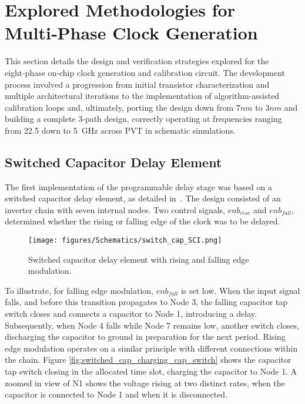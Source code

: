 \section{Explored Methodologies for Multi‑Phase Clock Generation}\label{sec:methodology}

This section details the design and verification strategies explored for the eight‑phase on‑chip clock generation and calibration circuit. The development process involved a progression from initial transistor characterization and multiple architectural iterations to the implementation of algorithm-assisted calibration loops and, ultimately, porting the design down from $7nm$ to $3 nm$ and building a complete 3-path design, correctly operating at frequencies ranging from 22.5 down to 5~GHz across PVT in schematic simulations.

\subsection{Switched Capacitor Delay Element}\label{sec:switched_cap}

The first implementation of the programmable delay stage was based on a switched capacitor delay element, as detailed in~\cite{Ramazanoglu2018switched}. The design consisted of an inverter chain with seven internal nodes. Two control signals, $enb_{rise}$ and $enb_{fall}$, determined whether the rising or falling edge of the clock was to be delayed.

\begin{figure}[h]
  \centering
  \texttt{[image: figures/Schematics/switch\_cap\_SCI.png]}
  \caption{Switched capacitor delay element with rising and falling edge modulation.}
  \label{fig:switched_cap_delay_element}
\end{figure}

To illustrate, for falling edge modulation, $enb_{fall}$ is set low. When the input signal falls, and before this transition propagates to Node 3, the falling capacitor tap switch closes and connects a capacitor to Node 1, introducing a delay. Subsequently, when Node 4 falls while Node 7 remains low, another switch closes, discharging the capacitor to ground in preparation for the next period. Rising edge modulation operates on a similar principle with different connections within the chain. Figure \ref{fig:switched_cap_charging_cap_switch} shows the capacitor tap switch closing in the allocated time slot, charging the capacitor to Node 1. A zoomed in view of N1 shows the voltage rising at two distinct rates, when the capacitor is connected to Node 1 and when it is disconnected.


